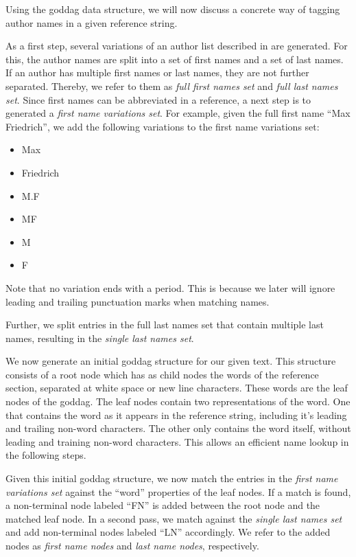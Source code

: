 \bigskip

Using the \gls{goddag} data structure, we will now discuss a concrete way of tagging author names in a given reference string.

As a first step, several variations of an author list described in  are generated.
For this, the author names are split into a set of first names and a set of last names.
If an author has multiple first names or last names, they are not further separated.
Thereby, we refer to them as \textit{full first names set} and \textit{full last names set}.
Since first names can be abbreviated in a reference, a next step is to generated a \textit{first name variations set}.
For example, given the full first name ``Max Friedrich'', we add the following variations to the first name variations set:
\begin{itemize}
  \itemsep0em
  \item Max
  \item Friedrich
  \item M.F
  \item MF
  \item M
  \item F
\end{itemize}
Note that no variation ends with a period.
This is because we later will ignore leading and trailing punctuation marks when matching names.

Further, we split entries in the full last names set that contain multiple last names, resulting in the \textit{single last names set}.

\bigskip

We now generate an initial \gls{goddag} structure for our given text.
This structure consists of a root node which has as child nodes the words of the reference section, separated at white space or new line characters.
These words are the leaf nodes of the \gls{goddag}.
The leaf nodes contain two representations of the word.
One that contains the word as it appears in the reference string, including it's leading and trailing non-word characters.
The other only contains the word itself, without leading and training non-word characters.
This allows an efficient name lookup in the following steps.

Given this initial \gls{goddag} structure, we now match the entries in the \textit{first name variations set} against the ``word'' properties of the leaf nodes.
If a match is found, a non-terminal node labeled ``FN'' is added between the root node and the matched leaf node.
In a second pass, we match against the \textit{single last names set} and add non-terminal nodes labeled ``LN'' accordingly.
We refer to the added nodes as \textit{first name nodes} and \textit{last name nodes}, respectively.


